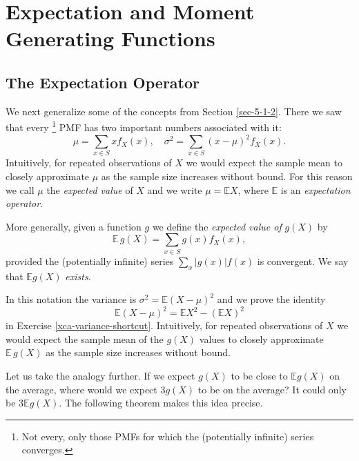 \documentclass[captions=tableheading]{scrbook}
\begin{document}
\section{Expectation and Moment Generating Functions}
\label{sec-5-4}
\label{sec-expectation-and-mgfs}
\subsection{The Expectation Operator}
\label{sec-5-4-1}
\label{sub-expectation-operator}


We next generalize some of the concepts from Section \ref{sec-5-1-2}. There we saw that every
\footnote{Not every, only those PMFs for which the (potentially infinite) series converges.}
PMF has two important numbers associated with it:
\begin{equation}
\mu=\sum_{x\in S}xf_{X}(x),\quad\sigma^{2}=\sum_{x\in S}(x-\mu)^{2}f_{X}(x).
\end{equation}
Intuitively, for repeated observations of \(X\) we would expect the sample mean to closely approximate \(\mu\) as the sample size increases without bound. For this reason we call \(\mu\) the \emph{expected value} of \(X\) and we write \(\mu=\mathbb{E} X\), where \(\mathbb{E}\) is an \emph{expectation operator}.

\begin{defn}
More generally, given a function \(g\) we define the \emph{expected value of} \(g(X)\) by
\begin{equation}
\mathbb{E}\, g(X)=\sum_{x\in S}g(x)f_{X}(x),
\end{equation}
provided the (potentially infinite) series \(\sum_{x}|g(x)|f(x)\) is convergent. We say that \(\mathbb{E} g(X)\) \emph{exists}.
\end{defn}

In this notation the variance is \(\sigma^{2}=\mathbb{E}(X-\mu)^{2}\) and we prove the identity
\begin{equation}
\mathbb{E}(X-\mu)^{2}=\mathbb{E} X^{2}-(\mathbb{E} X)^{2}
\end{equation}
in Exercise \ref{xca-variance-shortcut}. Intuitively, for repeated observations of \(X\) we would expect the sample mean of the \(g(X)\) values to closely approximate \(\mathbb{E}\, g(X)\) as the sample size increases without bound.

Let us take the analogy further. If we expect \(g(X)\) to be close to \(\mathbb{E} g(X)\) on the average, where would we expect \(3g(X)\) to be on the average? It could only be \(3\mathbb{E} g(X)\). The following theorem makes this idea precise.
\end{document}
